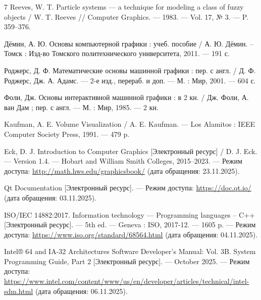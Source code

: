 
\begin{thebibliography}{7}
Reeves, W. T. Particle systems — a technique for modeling a class of fuzzy objects / W. T. Reeves // Computer Graphics. — 1983. — Vol. 17, № 3. — P. 359–376.

Дёмин, А. Ю. Основы компьютерной графики : учеб. пособие / А. Ю. Дёмин. -- Томск : Изд-во Томского политехнического университета, 2011. — 191 с.

Роджерс, Д. Ф. Математические основы машинной графики : пер. с англ. / Д. Ф. Роджерс, Дж. А. Адамс. — 2-е изд., перераб. и доп. — М. : Мир, 2001. — 604 с.

Фоли, Дж. Основы интерактивной машинной графики : в 2 кн. / Дж. Фоли, А. ван Дам ; пер. с англ. — М. : Мир, 1985. — 2 кн.

Kaufman, A. E. Volume Visualization / A. E. Kaufman. — Los Alamitos : IEEE Computer Society Press, 1991. — 479 p.

Eck, D. J. Introduction to Computer Graphics [Электронный ресурс] / D. J. Eck. — Version 1.4. — Hobart and William Smith Colleges, 2015–2023. — Режим доступа: \url{http://math.hws.edu/graphicsbook/} (дата обращения: 23.11.2025).

Qt Documentation [Электронный ресурс]. — Режим доступа: \url{https://doc.qt.io/} (дата обращения: 03.11.2025).

ISO/IEC 14882:2017. Information technology — Programming languages -- C++ [Электронный ресурс]. — 5th ed. — Geneva : ISO, 2017-12. — 1605 p. — Режим доступа: \url{https://www.iso.org/standard/68564.html} (дата обращения: 04.11.2025).

Intel® 64 and IA-32 Architectures Software Developer's Manual: Vol. 3B. System Programming Guide, Part 2 [Электронный ресурс]. — October 2025. — Режим доступа: \url{https://www.intel.com/content/www/us/en/developer/articles/technical/intel-sdm.html} (дата обращения: 06.11.2025).
	
\end{thebibliography}


\clearpage
